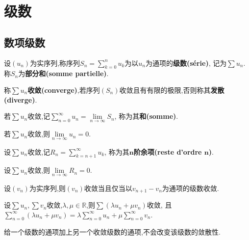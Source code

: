 \chapter{级数}

\section{数项级数}

\begin{deff}
    设$(u_n)$为实序列,称序列$S_n = \sum\limits_{k=0}^n u_k$为以$u_n$为通项的\textbf{级数(série)},
    记为$\sum u_n$.称$S_n$为\textbf{部分和(somme partielle)}.
\end{deff}

\begin{deff}
    称$\sum u_n$\textbf{收敛(converge)},若序列$(S_n)$收敛且有有限的极限,否则称其\textbf{发散(diverge)}.

    若$\sum u_n$收敛,记$\sum\limits_{n=0}^{\infty} u_n = \lim\limits_{n\to\infty}S_n$,
    称为其\textbf{和(somme)}.
\end{deff}

\begin{prop}
    若$\sum u_n$收敛,则$\lim\limits_{n\to\infty} u_n = 0$.
\end{prop}

\begin{rqq}
    设$\sum u_n$收敛,记$R_n=\sum\limits_{k=n+1}^{\infty} u_k$,
    称为其\textbf{$\boldsymbol{n}$阶余项(reste d'ordre $\boldsymbol{n}$)}.
\end{rqq}

\begin{prop}
    设$\sum u_n$收敛,则$\lim\limits_{n\to\infty}R_n=0$.
\end{prop}

\begin{prop}
    设$(v_n)$为实序列,则$(v_n)$收敛当且仅当以$v_{n + 1} - v_n$为通项的级数收敛.
\end{prop}

\begin{prop}
    设$\sum u_n, \sum v_n$收敛,$\lambda, \mu \in \mathbb{R}$,则$\sum (\lambda u_n + \mu v_n)$收敛,
    且$\sum\limits_{n = 0}^{\infty} (\lambda u_n + \mu v_n) = \lambda \sum\limits_{n = 0}^{\infty} u_n +
    \mu \sum\limits_{n = 0}^{\infty} v_n$.
\end{prop}

\begin{cor}
    给一个级数的通项加上另一个收敛级数的通项,不会改变该级数的敛散性.
\end{cor}

